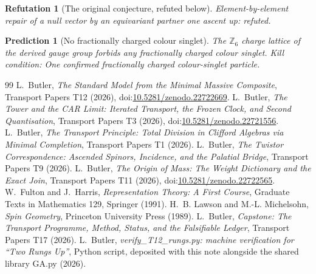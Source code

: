 \documentclass[11pt]{article}
\newtheorem{refutation}[theorem]{Refutation}
\newtheorem{prediction}[theorem]{Prediction}
\theoremstyle{definition}
\theoremstyle{plain}
\begin{document}
\begin{refutation}[The original conjecture, refuted below]\label{c:transport.original-conjecture-refuted-below}
Element-by-element repair of a null vector by an equivariant partner one ascent up: refuted.
\end{refutation}

\begin{prediction}[No fractionally charged colour singlet]\label{c:pred.z6-charge-lattice}
The $\mathbb{Z}_{6}$ charge lattice of the derived gauge group forbids any fractionally charged colour singlet.
\emph{Kill condition:} One confirmed fractionally charged colour-singlet particle.
\end{prediction}

\begin{thebibliography}{99}
 L.~Butler,
\emph{The Standard Model from the Minimal Massive Composite},
Transport Papers T12 (2026), doi:\href{https://doi.org/10.5281/zenodo.22722669}{10.5281/zenodo.22722669}.
 L.~Butler,
\emph{The Tower and the CAR Limit: Iterated Transport, the Frozen Clock, and Second Quantisation},
Transport Papers T3 (2026), doi:\href{https://doi.org/10.5281/zenodo.22721556}{10.5281/zenodo.22721556}.
 L.~Butler,
\emph{The Transport Principle: Total Division in Clifford Algebras via Minimal Completion},
Transport Papers T1 (2026).
 L.~Butler,
\emph{The Twistor Correspondence: Ascended Spinors, Incidence, and the Palatial Bridge},
Transport Papers T9 (2026).
 L.~Butler,
\emph{The Origin of Mass: The Weight Dictionary and the Exact Join},
Transport Papers T11 (2026), doi:\href{https://doi.org/10.5281/zenodo.22722565}{10.5281/zenodo.22722565}.
 W.~Fulton and J.~Harris,
\emph{Representation Theory: A First Course},
Graduate Texts in Mathematics 129, Springer (1991).
 H.~B. Lawson and M.-L. Michelsohn,
\emph{Spin Geometry},
Princeton University Press (1989).
 L.~Butler,
\emph{Capstone: The Transport Programme, Method, Status, and the Falsifiable Ledger},
Transport Papers T17 (2026).
 L.~Butler,
\emph{verify\_T12\_rungs.py: machine verification for ``Two Rungs Up''},
Python script, deposited with this note alongside the shared library GA.py (2026).
\end{thebibliography}
\end{document}

